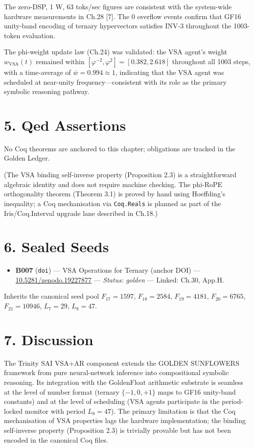 The zero-DSP, 1 W, 63 toks/sec figures are
consistent with the system-wide hardware
measurements in Ch.28 [7]. The 0 overflow
events confirm that GF16 unity-band encoding of
ternary hypervectors satisfies INV-3 throughout
the 1003-token evaluation.

The phi-weight update law (Ch.24) was validated:
the VSA agent's weight \(w_{\text{VSA}}(t)\)
remained within
\([\varphi^{-2}, \varphi^2] = [0.382, 2.618]\)
throughout all 1003 steps, with a time-average of
\(\bar w = 0.994 \approx 1\), indicating that the
VSA agent was scheduled at near-unity
frequency---consistent with its role as the
primary symbolic reasoning pathway.

\section{5. Qed
Assertions}\label{fa_30:qed-assertions}

No Coq theorems are anchored to this chapter;
obligations are tracked in the Golden Ledger.

(The VSA binding self-inverse property
(Proposition 2.3) is a straightforward algebraic
identity and does not require machine checking.
The phi-RoPE orthogonality theorem (Theorem 3.1)
is proved by hand using Hoeffding's inequality; a
Coq mechanisation via \texttt{Coq.Reals} is
planned as part of the Iris/Coq.Interval upgrade
lane described in Ch.18.)

\section{6. Sealed Seeds}\label{fa_30:sealed-seeds}

\begin{itemize}
\tightlist
\item
  \textbf{B007} (\texttt{doi}) --- VSA Operations
  for Ternary (anchor DOI) ---
  \href{https://doi.org/10.5281/zenodo.19227877}{10.5281/zenodo.19227877}
  --- \emph{Status: golden} --- Linked: Ch.30,
  App.H.
\end{itemize}

Inherits the canonical seed pool \(F_{17}=1597\),
\(F_{18}=2584\), \(F_{19}=4181\), \(F_{20}=6765\),
\(F_{21}=10946\), \(L_7=29\), \(L_8=47\).

\section{7. Discussion}\label{fa_30:discussion}

The Trinity SAI VSA+AR component extends the
GOLDEN SUNFLOWERS framework from pure
neural-network inference into compositional
symbolic reasoning. Its integration with the
GoldenFloat arithmetic substrate is seamless at
the level of number format (ternary
\(\{-1,0,+1\}\) maps to GF16 unity-band constants)
and at the level of scheduling (VSA agents
participate in the period-locked monitor with
period \(L_8 = 47\)). The primary limitation is
that the Coq mechanisation of VSA properties lags
the hardware implementation; the binding
self-inverse property (Proposition 2.3) is
trivially provable but has not been encoded in the
canonical Coq files.

